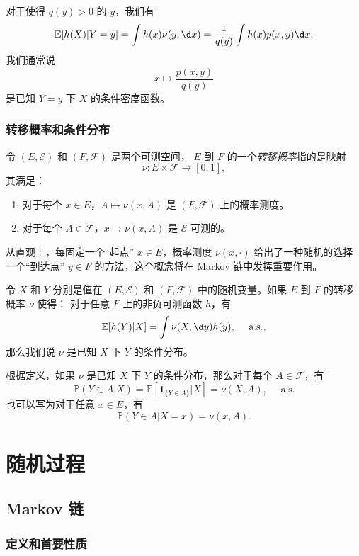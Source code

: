\documentclass[fontset=none]{Notes}
\newcommand{\indicator}[1]{\mathbold 1_{#1}}
\newcommand{\alsu}[1]{\text{$#1$ a.s.}}
\begin{document}
对于使得 $q(y)>0$ 的 $y$，我们有
\[
  \mathbb{E}[h(X)|Y=y]=\int h(x)\nu(y,\d x)
  =\frac{1}{q(y)}\int h(x)p(x,y)\d x,  
\]
我们通常说
\[
  x\mapsto\frac{p(x,y)}{q(y)}  
\]
是已知 $Y=y$ 下 $X$ 的条件密度函数。

\section{转移概率和条件分布}

\begin{definition}
  令 $(E,\mathcal{E})$ 和 $(F,\mathcal{F})$ 是两个可测空间，
  $E$ 到 $F$ 的一个\emph{转移概率}指的是映射
  \[
    \nu:E\times \mathcal{F}\to [0,1],  
  \]
  其满足：
  \begin{enumerate}
    \item 对于每个 $x\in E$，$A\mapsto \nu(x,A)$ 是
    $(F,\mathcal{F})$ 上的概率测度。
    \item 对于每个 $A\in \mathcal{F}$，$x\mapsto \nu(x,A)$
    是 $\mathcal{E}$-可测的。
  \end{enumerate}
\end{definition}

从直观上，每固定一个“起点” $x\in E$，概率测度 $\nu(x,\cdot)$
给出了一种随机的选择一个“到达点” $y\in F$ 的方法，这个概念将在
Markov 链中发挥重要作用。

\begin{definition}
  令 $X$ 和 $Y$ 分别是值在 $(E,\mathcal{E})$ 和 $(F,\mathcal{F})$
  中的随机变量。如果 $E$ 到 $F$ 的转移概率 $\nu$ 使得：
  对于任意 $F$ 上的非负可测函数 $h$，有
  \[
    \mathbb{E}[h(Y)|X]=\int\nu(X,\d y) h(y),\quad 
    \alsu{},  
  \]
  那么我们说 $\nu$ 是已知 $X$ 下 $Y$ 的条件分布。
\end{definition}

根据定义，如果 $\nu$ 是已知 $X$ 下 $Y$ 的条件分布，那么对于每个
$A\in \mathcal{F}$，有
\[
  \mathbb{P}(Y\in A|X)=\mathbb{E}[\indicator{\{Y\in A\}}|X]
  =\nu(X,A),\quad \alsu{}
\]
也可以写为对于任意 $x\in E$，有
\[
  \mathbb{P}(Y\in A| X=x)=\nu(x,A).  
\]

\part{随机过程}

\chapter{Markov 链}

\section{定义和首要性质}
\end{document}
